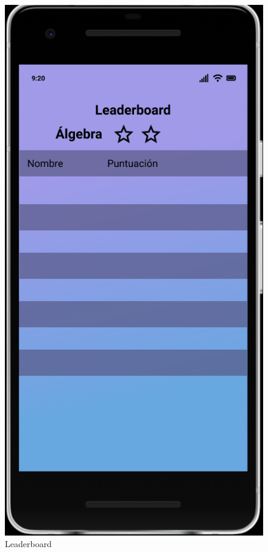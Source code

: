 \documentclass{article}
\begin{document}
\begin{figure}[H]
    \centering
    \includegraphics[scale=0.9]{imgs/Figma/Leaderboard}
    \caption{Leaderboard}
\end{figure}
\end{document}

